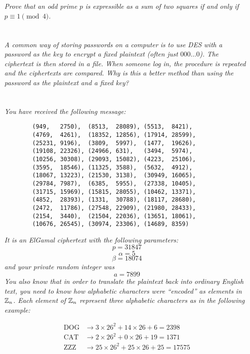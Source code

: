 \documentclass[12pt]{article}
\begin{document}
\section{} \textit{Prove that an odd prime $p$ is expressible as a sum of two squares if and only if $p \equiv 1 \pmod{4}$.}

\section{} \textit{A common way of storing passwords on a computer is to use DES with a password as the key to encrypt a fixed plaintext (often just $000\dots0$). The ciphertext is then stored in a file. When someone log in, the procedure is repeated and the ciphertexts are compared. Why is this a better method than using the password as the plaintext and a fixed key?}

\section{} \textit{You have received the following message:}

    \begin{verbatim}
        (949,   2750),  (8513,  28089), (5513,  8421),
        (4769,  4261),  (18352, 12856), (17914, 28599),
        (25231, 9196),  (3809,  5997),  (1477,  19626),
        (19108, 22326), (24966, 631),   (3494,  5974),
        (10256, 30308), (29093, 15082), (4223,  25106),
        (3595,  18546), (11325, 3588),  (5632,  4912),
        (18067, 13223), (21530, 3138),  (30949, 16065),
        (29784, 7987),  (6385,  5955),  (27338, 10405),
        (31715, 15969), (15815, 28055), (10462, 13371),
        (4852,  28393), (1331,  30788), (18117, 28680),
        (2472,  11786), (27548, 22909), (21980, 28433),
        (2154,  3440),  (21504, 22036), (13651, 18061),
        (10676, 26545), (30974, 23306), (14689, 8359)
    \end{verbatim}

\textit{It is an ElGamal ciphertext with the following parameters:}
    $$p = 31847$$
    $$\alpha = 5$$
    $$\beta = 18074$$
\textit{and your private random integer was}
    $$a = 7899$$
\textit{You also know that in order to translate the plaintext back into ordinary English text, you need to know how alphabetic characters were ``encoded'' as elements in $\mathbb{Z}_n$.  Each element of $\mathbb{Z}_n$ represent three alphabetic characters as in the following example:}

    \begin{align*}
        \text{DOG} &\to 3 \times 26^2 + 14 \times 26 + 6 = 2398\\
        \text{CAT} &\to 2 \times 26^2 + 0 \times 26 + 19 = 1371\\
        \text{ZZZ} &\to 25 \times 26^2 + 25 \times 26 + 25 = 17575\\
    \end{align*}
\end{document}
